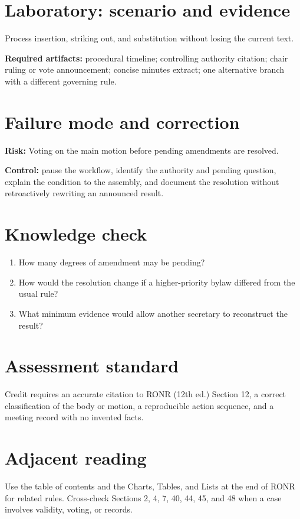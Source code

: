 \documentclass[11pt]{article}
\begin{document}
\section{Laboratory: scenario and evidence}
Process insertion, striking out, and substitution without losing the current text.

\textbf{Required artifacts:} procedural timeline; controlling authority citation; chair ruling or vote announcement; concise minutes extract; one alternative branch with a different governing rule.

\section{Failure mode and correction}
\textbf{Risk:} Voting on the main motion before pending amendments are resolved.

\textbf{Control:} pause the workflow, identify the authority and pending question, explain the condition to the assembly, and document the resolution without retroactively rewriting an announced result.

\section{Knowledge check}
\begin{enumerate}[leftmargin=*,itemsep=4pt]
\item How many degrees of amendment may be pending?
\item How would the resolution change if a higher-priority bylaw differed from the usual rule?
\item What minimum evidence would allow another secretary to reconstruct the result?
\end{enumerate}

\section{Assessment standard}
Credit requires an accurate citation to RONR (12th ed.) Section 12, a correct classification of the body or motion, a reproducible action sequence, and a meeting record with no invented facts.

\section{Adjacent reading}
Use the table of contents and the Charts, Tables, and Lists at the end of RONR for related rules. Cross-check Sections 2, 4, 7, 40, 44, 45, and 48 when a case involves validity, voting, or records.
\end{document}
